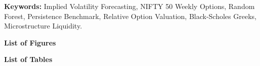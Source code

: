 \documentclass[11pt,oneside]{report}
\begin{document}
\vspace{0.5cm}
\noindent
\textbf{Keywords:} Implied Volatility Forecasting, NIFTY 50 Weekly Options, Random Forest, Persistence Benchmark, Relative Option Valuation, Black-Scholes Greeks, Microstructure Liquidity.

\newpage
{}
{}
\setcounter{tocdepth}{1}
\begingroup
\makeatletter
\renewcommand*\l@chapter[2]{%
  \ifnum \c@tocdepth >\m@ne
    \addpenalty{-\@highpenalty}%
    \vskip 0.40em \@plus\p@
    \setlength\@tempdima{1.5em}%
    \begingroup
      \parindent \z@ \rightskip \@pnumwidth
      \parfillskip -\@pnumwidth
      \leavevmode \bfseries
      \advance\leftskip\@tempdima
      \hskip -\leftskip
      #1\nobreak\hfil \nobreak\hb@xt@\@pnumwidth{\hss #2}\par
      \penalty\@highpenalty
    \endgroup
  \fi}
\makeatother
\tableofcontents
\endgroup

\newpage
{}
{}
\begin{center}
    \textbf{\Large List of Figures}
\end{center}
\vspace{-0.2cm}
\makeatletter
{}
\makeatother

\vspace{0.4cm}
\begin{center}
    \textbf{\Large List of Tables}
\end{center}
\vspace{-0.2cm}
\makeatletter
{}
\makeatother
\end{document}

